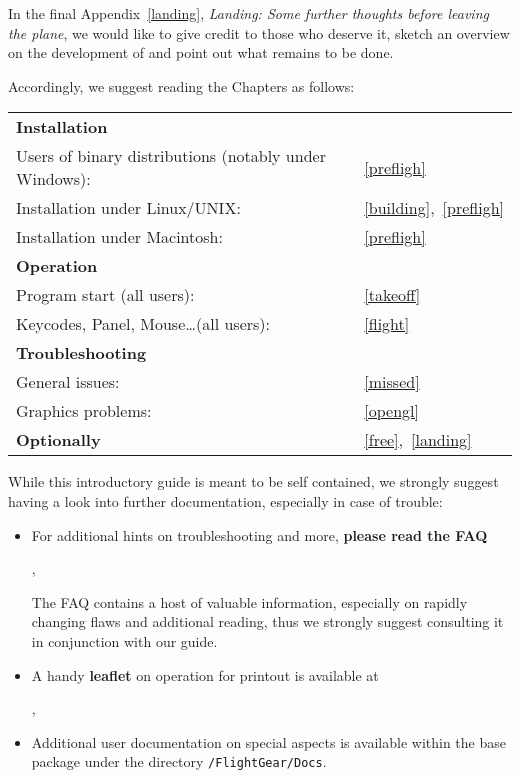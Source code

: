 \noindent
  In the final Appendix~\ref{landing}, \textit{Landing: Some further thoughts before leaving the plane}, we would like to give credit to those who deserve it, sketch an overview
on the development of \FlightGear and point out what remains to be done.
 \medskip

 \noindent
 Accordingly, we suggest reading the Chapters as follows:
 \medskip


\noindent
\begin{tabular}{ll}
 \textbf{Installation}                                  	&\\
 Users of binary distributions (notably under Windows):	 	&~\ref{prefligh}\\
 Installation under Linux/UNIX:               			&~\ref{building},~\ref{prefligh}\\
 Installation under Macintosh:               			&~\ref{prefligh}\\
  \textbf{Operation}                           			& \\
 Program start (all users):                      		&~\ref{takeoff}\\
 Keycodes, Panel, Mouse\ldots (all users):       		&~\ref{flight}\\
 \textbf{Troubleshooting}                      				& \\
 General issues:																						&~\ref{missed}\\
 Graphics problems: 									            				&~\ref{opengl}\\
 \textbf{Optionally}                           						&~\ref{free},~\ref{landing} 
\end{tabular}
\bigskip

\noindent
 While this introductory guide is meant to be self contained, we strongly suggest having a look into further documentation, especially in case of trouble:

\begin{itemize}
 \item For additional hints on troubleshooting and more, \textbf{please read the FAQ} 
 \medskip

 \noindent
 ,
 
 The FAQ contains a host of valuable information, especially on rapidly changing flaws and additional reading, thus we strongly suggest consulting it in conjunction with our guide.
 
 
 \item A handy \textbf{leaflet} on operation for printout is available at
 \medskip

 \noindent
 ,
 \item Additional user documentation on special aspects is available within the base package under the directory \texttt{/FlightGear/Docs}.
 \end{itemize}

